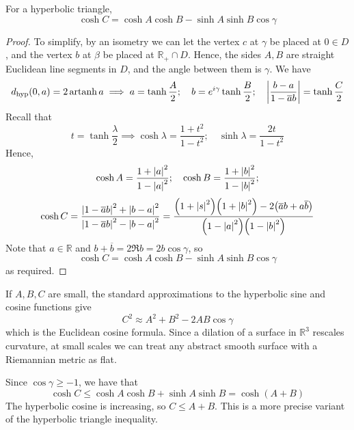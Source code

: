 \begin{proposition}
	For a hyperbolic triangle,
	\[ \cosh C = \cosh A \cosh B - \sinh A \sinh B \cos \gamma \]
\end{proposition}
\begin{proof}
	To simplify, by an isometry we can let the vertex \( c \) at \( \gamma \) be placed at \( 0 \in D \), and the vertex \( b \) at \( \beta \) be placed at \( \mathbb R_+ \cap D \).
	Hence, the sides \( A, B \) are straight Euclidean line segments in \( D \), and the angle between them is \( \gamma \).
	We have
	\[ d_{\text{hyp}}(0,a) = 2 \operatorname{artanh} a \implies a = \tanh \frac{A}{2};\quad b = e^{i\gamma} \tanh \frac{B}{2};\quad \abs{\frac{b-a}{1-\overline a b}} = \tanh \frac{C}{2} \]
	Recall that
	\[ t = \tanh \frac{\lambda}{2} \implies \cosh \lambda = \frac{1+t^2}{1-t^2};\quad \sinh \lambda = \frac{2t}{1-t^2} \]
	Hence,
	\[ \cosh A = \frac{1 + \abs{a}^2}{1 - \abs{a}^2};\quad \cosh B = \frac{1 + \abs{b}^2}{1 - \abs{b}^2}; \]
	\[ \cosh C = \frac{\abs{1-\overline a b}^2 + \abs{b-a}^2}{\abs{1-\overline a b}^2 - \abs{b-a}^2} = \frac{\qty(1+\abs{s}^2)\qty(1+\abs{b}^2) - 2\qty(\overline a b + a \overline b)}{\qty(1 - \abs{a}^2)\qty(1 - \abs{b}^2)} \]
	Note that \( a \in \mathbb R \) and \( b + \overline b = 2 \Re b = 2b \cos \gamma \), so
	\[ \cosh C = \cosh A \cosh B - \sinh A \sinh B \cos \gamma \]
	as required.
\end{proof}
\begin{remark}
	If \( A, B, C \) are small, the standard approximations to the hyperbolic sine and cosine functions give
	\[ C^2 \approx A^2 + B^2 - 2AB \cos \gamma \]
	which is the Euclidean cosine formula.
	Since a dilation of a surface in \( \mathbb R^3 \) rescales curvature, at small scales we can treat any abstract smooth surface with a Riemannian metric as flat.

	Since \( \cos \gamma \geq -1 \), we have that
	\[ \cosh C \leq \cosh A \cosh B + \sinh A \sinh B = \cosh(A+B) \]
	The hyperbolic cosine is increasing, so \( C \leq A + B \).
	This is a more precise variant of the hyperbolic triangle inequality.
\end{remark}

